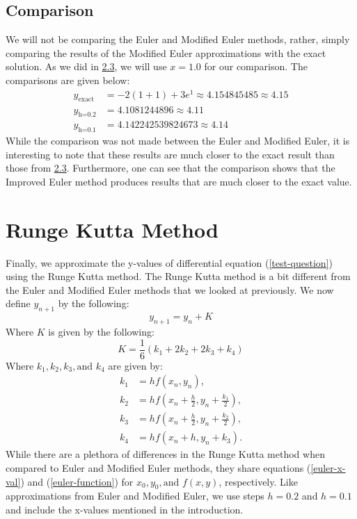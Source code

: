 \documentclass{article}
\begin{document}
\subsection{Comparison}
\label{sec:3.3}
We will not be comparing the Euler and Modified Euler methods, rather, simply comparing the results of the Modified Euler approximations with the exact solution. As we did in \hyperref[sec:2.3]{2.3}, we will use $x=1.0$ for our comparison. The comparisons are given below:
\begin{equation*}
    \begin{split}
        y_{\text{exact}} &= -2(1+1)+3e^1 \approx 4.154845485 \approx 4.15 \\
        y_{\text{h=0.2}} &= 4.1081244896 \approx 4.11 \\
        y_{\text{h=0.1}} &= 4.142242539824673 \approx 4.14
    \end{split}
\end{equation*}
While the comparison was not made between the Euler and Modified Euler, it is interesting to note that these results are much closer to the exact result than those from \hyperref[sec:2.3]{2.3}. Furthermore, one can see that the comparison shows that the Improved Euler method produces results that are much closer to the exact value.
\section{Runge Kutta Method}
Finally, we approximate the y-values of differential equation (\ref{test-question}) using the Runge Kutta method. The Runge Kutta method is a bit different from the Euler and Modified Euler methods that we looked at previously. We now define $y_{n+1}$ by the following:
\begin{equation}
    y_{n+1}=y_n + K
\end{equation}
Where $K$ is given by the following:
\begin{equation}
    K=\frac{1}{6}(k_1+2k_2+2k_3+k_4)
\end{equation}
Where $k_1, k_2, k_3, \text{and } k_4$ are given by:
\begin{equation}
    \begin{split}
        k_1 &= hf(x_n,y_n), \\
        k_2 &= hf\left(x_n+\frac{h}{2}, y_n+\frac{k_1}{2}\right), \\
        k_3 &= hf\left(x_n+\frac{h}{2}, y_n+\frac{k_2}{2}\right), \\
        k_4 &= hf(x_n+h, y_n+k_3).
    \end{split}
\end{equation}
While there are a plethora of differences in the Runge Kutta method when compared to Euler and Modified Euler methods, they share equations (\ref{euler-x-val}) and (\ref{euler-function}) for $x_0, y_0, \text{and } f(x,y)$, respectively. Like approximations from Euler and Modified Euler, we use steps $h=0.2$ and $h=0.1$ and include the x-values mentioned in the introduction. 
\end{document}
